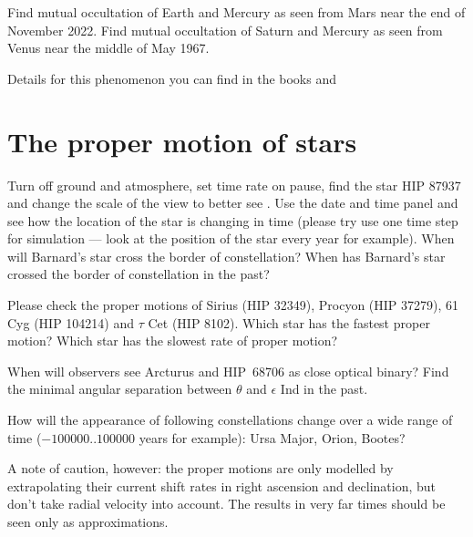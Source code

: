Find mutual occultation of Earth and Mercury as seen from 
Mars near the end of November 2022. Find mutual occultation 
of Saturn and Mercury as seen from Venus near the middle of 
May 1967.

Details for this phenomenon you can find in the books 
 and 

\section{The proper motion of stars}
\label{sec:Exercises:ProperMotion}

Turn off ground and atmosphere, set time rate on pause, 
find the star HIP 87937 and change the scale of the view 
to better see . Use the date and 
time panel and see how the location of the star is 
changing in time (please try use one time step for 
simulation --- look at the position of the star every 
year for example). When will Barnard's star cross 
the border of constellation? When has Barnard's star  
crossed the border of constellation in the past? 

Please check the proper motions of Sirius (HIP 32349), 
Procyon (HIP 37279), 61 Cyg (HIP 104214) and $\tau$ Cet 
(HIP 8102). Which star has the fastest proper motion? Which 
star has the slowest rate of proper motion?

When will observers see Arcturus and HIP~68706 as close optical binary? 
Find the minimal angular separation between $\theta$ and $\epsilon$ Ind in the past.

How will the appearance of following constellations change 
over a wide range of time ($-100000..100000$ years for 
example): Ursa Major, Orion, Bootes?

A note of caution, however: the proper motions are only modelled by extrapolating their current 
shift rates in right ascension and declination, but don't take radial velocity into account. 
The results in very far times should be seen only as approximations.

